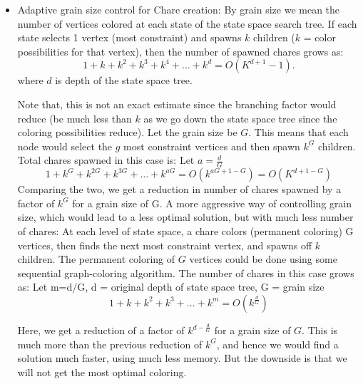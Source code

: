 \documentclass[10pt,twoside]{article}
\begin{document}
\begin{itemize}
  \item Adaptive grain size control for Chare creation: By grain size we mean
  the number of vertices colored at each state of the state space search tree.  
  If each state selects 1 vertex (most constraint) and spawns $k$ children
  ($k$ = color possibilities for that vertex), then the
  number of spawned chares grows as: 
  \[ 
  1 + k + k^2 + k^3 + k^4  + \dots + k^d  = O(K^{d+1} - 1). 
  \] where $d$ is depth of the state space tree.
  
  Note that, this is not an exact estimate since the branching factor would reduce
  (be much less than $k$ as we go down the state space tree since the coloring
   possibilities reduce). Let the grain size be $G$. This means that each node
  would select the $g$ most constraint vertices and then spawn $k^G$ children. Total
  chares spawned in this case is: 
  Let $a = \frac{d}{G}$
  \[
  1 + k^G + k^{2G} + k^{3G} + \dots + k^{aG} =  O(k^{aG + 1 - G}) = O (K ^ {d + 1 - G})	
  \]
  Comparing the two, we get a reduction in number of chares spawned by a factor of $k^G$ for a grain size of
  G.  
  A more aggressive way of controlling grain size, which would lead to a less
  optimal solution, but with much less number of chares: 
      At each level of state space, a chare colors (permanent coloring) G
      vertices, then finds the next most constraint vertex, and spawns off $k$
      children. The permanent coloring of $G$ vertices could be done using some
      sequential graph-coloring algorithm.  The number of chares in this case
      grows as: 
      Let  m=d/G, d = original depth of state space tree, G = grain size
      \[
      1 + k + k^2 + k^3 + \dots + k^m = O (k^{\frac{d}{G}}) 
      \]
      
      Here, we get a reduction of a factor of $k^{d-\frac{d}{G}}$ for a grain size of $G$.
              This is much more than the previous reduction of $k^G$, and hence
              we would find a solution much faster, using much less memory. But
              the downside is that we will not get the most optimal coloring.
\end{itemize}  
\end{document}
